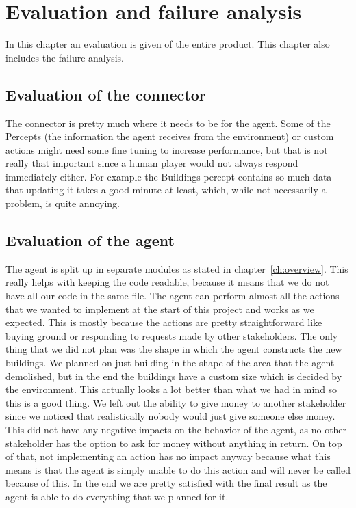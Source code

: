 \chapter{Evaluation and failure analysis}
In this chapter an evaluation is given of the entire product. This chapter also includes the failure analysis. 

\section{Evaluation of the connector}
The connector is pretty much where it needs to be for the agent.
Some of the Percepts (the information the agent receives from the environment) or custom actions might need some fine tuning to increase performance, but that is not really that important since a human player would not always respond immediately either.
For example the Buildings percept contains so much data that updating it takes a good minute at least, which, while not necessarily a problem, is quite annoying.

\section{Evaluation of the agent}
The agent is split up in separate modules as stated in chapter~\ref{ch:overview}.
This really helps with keeping the code readable, because it means that we do not have all our code in the same file.
The agent can perform almost all the actions that we wanted to implement at the start of this project and works as we expected.
This is mostly because the actions are pretty straightforward like buying ground or responding to requests made by other stakeholders.
The only thing that we did not plan was the shape in which the agent constructs the new buildings. We planned on just building in the shape of the area that the agent demolished, but in the end the buildings have a custom size which is decided by the environment. This actually looks a lot better than what we had in mind so this is a good thing.
We left out the ability to give money to another stakeholder since we noticed that realistically nobody would just give someone else money. 
This did not have any negative impacts on the behavior of the agent, as no other stakeholder has the option to ask for money without anything in return.
On top of that, not implementing an action has no impact anyway because what this means is that the agent is simply unable to do this action and will never be called because of this. In the end we are pretty satisfied with the final result as the agent is able to do everything that we planned for it. 

